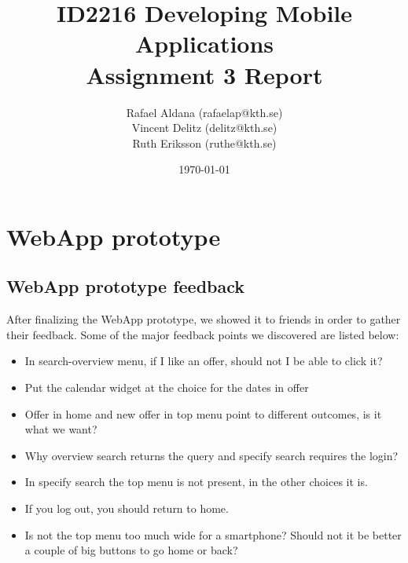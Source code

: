 \documentclass[11pt,twoside,a4paper]{report}
\begin{document}
\title{ID2216 Developing Mobile Applications\\Assignment 3 Report}
\author{Rafael Aldana (rafaelap@kth.se)\\Vincent Delitz (delitz@kth.se)\\Ruth Eriksson (ruthe@kth.se)}
\date{\today}
\maketitle



\tableofcontents
\thispagestyle{empty}



\renewcommand{\chaptername}{Assignment}
\setcounter{chapter}{1}
\chapter{WebApp prototype}
\setcounter{page}{1}

\section{WebApp prototype feedback}


After finalizing the WebApp prototype, we showed it to friends in order to gather their feedback. Some of the major feedback points we discovered are listed below:

\begin{itemize}

\item In search-overview menu, if I like an offer, should not I be able to click it?

\item Put the calendar widget at the choice for the dates in offer

\item Offer in home and new offer in top menu point to different outcomes, is it what we want?

\item Why overview search returns the query and specify search requires the login?

\item In specify search the top menu is not present, in the other choices it is.

\item If you log out, you should return to home.

\item Is not the top menu too much wide for a smartphone? Should not it be better a couple of big buttons to go home or back?

\end{itemize}
\end{document}
